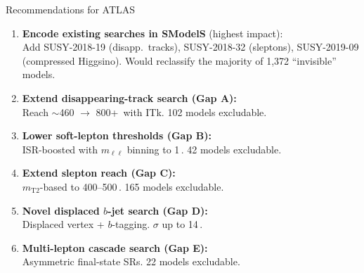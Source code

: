 \documentclass[aspectratio=169,10pt]{beamer}
\newcommand{\GeV}{\,\text{GeV}\xspace}
\newcommand{\pb}{\,\text{pb}\xspace}
\newcommand{\mll}{\ensuremath{m_{\ell\ell}}\xspace}
\newcommand{\mTtwo}{\ensuremath{m_{\text{T2}}}\xspace}
\begin{document}
\begin{frame}{Recommendations for ATLAS}
\begin{enumerate}
  \item \textbf{Encode existing searches in SModelS} (highest impact):\\
    {\small Add SUSY-2018-19 (disapp.\ tracks), SUSY-2018-32 (sleptons), SUSY-2019-09 (compressed Higgsino).
    Would reclassify the majority of 1,372 ``invisible'' models.}

  \item \textbf{Extend disappearing-track search (Gap A):}\\
    {\small Reach $\sim$460 $\to$ 800+\GeV with ITk. 102 models excludable.}

  \item \textbf{Lower soft-lepton thresholds (Gap B):}\\
    {\small ISR-boosted with \mll binning to 1\GeV. 42 models excludable.}

  \item \textbf{Extend slepton reach (Gap C):}\\
    {\small \mTtwo-based to 400--500\GeV. 165 models excludable.}

  \item \textbf{Novel displaced $b$-jet search (Gap D):}\\
    {\small Displaced vertex + $b$-tagging. $\sigma$ up to 14\pb.}

  \item \textbf{Multi-lepton cascade search (Gap E):}\\
    {\small Asymmetric final-state SRs. 22 models excludable.}
\end{enumerate}
\end{frame}
\end{document}
